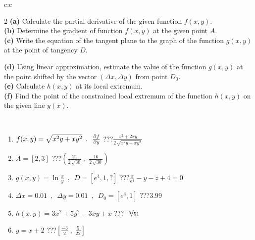\documentclass[10pt]{report}
\begin{document}
\begin{tabular}{c:c}
\begin{minipage}[c][104.5mm][t]{0.5\linewidth}
\begin{center}
\begin{minipage}{0.95\linewidth}
\begin{center}
{\begin{multicols}{2}
\textbf{(a)} Calculate the partial derivative of the given function \(f(x,y)\). \\[1mm]
\textbf{(b)} Determine the gradient of function \(f(x,y)\) at the given point \(A\). \\[1mm]
\textbf{(c)} Write the equation of the tangent plane to the graph of the function \(g(x,y)\) at the point of tangency \(D\). \par \columnbreak
\textbf{(d)} Using linear approximation, estimate the value of the function \(g(x,y)\) at the point shifted by the vector \((\Delta x, \Delta y)\) from point \(D_0\). \\[1mm]
\textbf{(e)} Calculate \(h(x,y)\) at its local extremum. \\[1mm]
\textbf{(f)} Find the point of the constrained local extremum of the function \(h(x,y)\) on the given line \(y(x)\). \\[1mm]
\end{multicols}
}
\end{center}
\end{minipage}
\\[4mm]
\begin{minipage}{0.79\linewidth}
\begin{center}
\begin{varwidth}{\linewidth}
\begin{enumerate}
\normalsizerr
\item $f(x,y) = \sqrt{x^2y + xy^2}\enspace , \enspace \pdv{f}{y}$\quad \dotfill\; ???\;\dotfill \quad $\frac{x^2+2xy}{2\,\sqrt{x^2y+xy^2}}$
\item $A = [2, 3]$\quad \dotfill\; ???\;\dotfill \quad $\left( \frac{21}{2\,\sqrt{30}} \;,\; \frac{16}{2\,\sqrt{30}} \right)$
\item $g(x,y) = \ln\frac{x}{y} \enspace , \enspace D=[e^{4},1,?]$\quad \dotfill\; ???\;\dotfill \quad $\frac{x}{e^4} - y - z + 4 = 0$
\item $\Delta x = {0.01} \enspace,\enspace \Delta y = {0.01} \enspace,\enspace D_0 = [e^{4},1]$\quad \dotfill\; ???\;\dotfill \quad $3.99$
\item $h(x,y) = 3x^2+5y^2-3xy+x$\quad \dotfill\; ???\;\dotfill \quad $\nicefrac{-5}{51}$
\item $y = x+2$\quad \dotfill\; ???\;\dotfill \quad $\left[\frac{-3}{2}\;,\;\frac{5}{22}\right]$
\end{enumerate}
\end{varwidth}
\end{center}
\end{minipage}
\begin{minipage}{0.20\linewidth}

\end{minipage}
\end{center}
\end{minipage}
\end{tabular}
\end{document}
